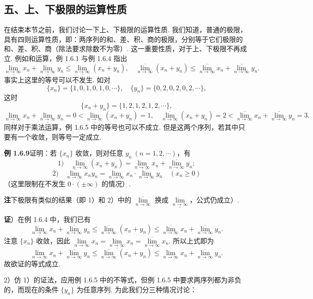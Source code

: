 \documentclass[UTF8,12pt,a4paper,fontset=fandol]{ctexart}
\begin{document}
\subsection*{五、上、下极限的运算性质}

在结束本节之前，我们讨论一下上、下极限的运算性质. 我们知道，普通的极限，具有四则运算性质，即：两序列的和、差、积、商的极限，分别等于它们极限的和、差、积、商（除法要求除数不为零）. 这一重要性质，对于上、下极限不再成立. 例如和运算，例 1.6.1 与例 1.6.4 指出
\[
  \underline{\lim_{n\to\infty}}x_n+\underline{\lim_{n\to\infty}}y_n
  \le \underline{\lim_{n\to\infty}}(x_n+y_n),\quad
  \overline{\lim_{n\to\infty}}(x_n+y_n)
  \le \overline{\lim_{n\to\infty}}x_n+\overline{\lim_{n\to\infty}}y_n.
\]
事实上这里的等号可以不发生. 如对
\[
  \{x_n\}=\{1,0,1,0,1,0,\cdots\},\quad
  \{y_n\}=\{0,2,0,2,0,2,\cdots\},
\]
这时
\[
  \{x_n+y_n\}=\{1,2,1,2,1,2,\cdots\},
\]
\[
  \underline{\lim_{n\to\infty}}x_n+\underline{\lim_{n\to\infty}}y_n
  =0<\underline{\lim_{n\to\infty}}(x_n+y_n)=1,\quad
  \overline{\lim_{n\to\infty}}(x_n+y_n)=2<\overline{\lim_{n\to\infty}}x_n+\overline{\lim_{n\to\infty}}y_n=3.
\]
同样对于乘法运算，例 1.6.5 中的等号也可以不成立. 但是这两个序列，若其中只要有一个收敛，则等号一定成立.

\noindent\textbf{例 1.6.9}\quad 证明：若 $\{x_n\}$ 收敛，则对任意 $y_n\ (n=1,2,\cdots)$，有
\[
  1)\quad \overline{\lim_{n\to\infty}}(x_n+y_n)=\lim_{n\to\infty}x_n+\overline{\lim_{n\to\infty}}y_n;
\]
\[
  2)\quad \overline{\lim_{n\to\infty}}x_ny_n
  =\lim_{n\to\infty}x_n\cdot\overline{\lim_{n\to\infty}}y_n\quad(x_n\ge0)
\]
（这里限制在不发生 $0\cdot(\pm\infty)$ 的情况）.

\noindent\textbf{注}\quad 下极限有类似的结果（即 1）和 2）中的 $\overline{\lim\limits_{n\to\infty}}$ 换成 $\underline{\lim\limits_{n\to\infty}}$，公式仍成立）.

\noindent\textbf{证}）在例 1.6.4 中，我们已有
\[
  \underline{\lim_{n\to\infty}}x_n+\overline{\lim_{n\to\infty}}y_n
  \le \overline{\lim_{n\to\infty}}(x_n+y_n)
  \le \overline{\lim_{n\to\infty}}x_n+\overline{\lim_{n\to\infty}}y_n.
\]
注意 $\{x_n\}$ 收敛，因此 $\lim\limits_{n\to\infty}x_n=\underline{\lim\limits_{n\to\infty}}x_n=\overline{\lim\limits_{n\to\infty}}x_n$. 所以上式即为
\[
  \lim_{n\to\infty}x_n+\overline{\lim_{n\to\infty}}y_n
  \le \overline{\lim_{n\to\infty}}(x_n+y_n)
  \le \lim_{n\to\infty}x_n+\overline{\lim_{n\to\infty}}y_n.
\]
故欲证的等式成立.

2）仿 1）的证法，应用例 1.6.5 中的不等式，但例 1.6.5 中要求两序列都为非负的，而现在的条件 $\{y_n\}$ 为任意序列. 为此我们分三种情况讨论：
\end{document}
